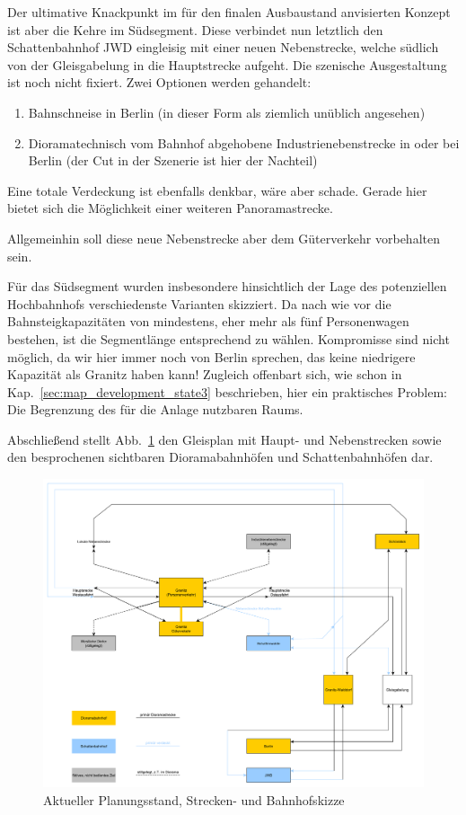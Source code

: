 Der ultimative Knackpunkt im f\"ur den finalen Ausbaustand anvisierten Konzept ist aber die Kehre im S\"udsegment.
Diese verbindet nun letztlich den Schattenbahnhof JWD eingleisig mit einer neuen Nebenstrecke, welche s\"udlich von der Gleisgabelung in die Hauptstrecke aufgeht.
Die szenische Ausgestaltung ist noch nicht fixiert.
Zwei Optionen werden gehandelt:
\begin{enumerate}
	\item Bahnschneise in Berlin (in dieser Form als ziemlich un\"ublich angesehen)
	\item Dioramatechnisch vom Bahnhof abgehobene Industrienebenstrecke in oder bei Berlin (der Cut in der Szenerie ist hier der Nachteil)
\end{enumerate}
Eine totale Verdeckung ist ebenfalls denkbar, w\"are aber schade.
Gerade hier bietet sich die M\"oglichkeit einer weiteren Panoramastrecke.

Allgemeinhin soll diese neue Nebenstrecke aber dem G\"uterverkehr vorbehalten sein.

F\"ur das S\"udsegment wurden insbesondere hinsichtlich der Lage des potenziellen Hochbahnhofs verschiedenste Varianten skizziert.
Da nach wie vor die Bahnsteigkapazit\"aten von mindestens, eher mehr als f\"unf Personenwagen bestehen, ist die Segmentl\"ange entsprechend zu w\"ahlen.
Kompromisse sind nicht m\"oglich, da wir hier immer noch von Berlin sprechen, das keine niedrigere Kapazit\"at als Granitz haben kann!
Zugleich offenbart sich, wie schon in Kap.~\ref{sec:map_development_state3} beschrieben, hier ein praktisches Problem:
Die Begrenzung des f\"ur die Anlage nutzbaren Raums.

Abschlie{\ss}end stellt Abb.~\ref{img:sketch_side_tracks_all} den Gleisplan mit Haupt- und Nebenstrecken sowie den besprochenen sichtbaren Dioramabahnh\"ofen und Schattenbahnh\"ofen dar.

\begin{figure}[h]
\centering
  \includegraphics[width=1.0\textwidth]{img/map_evolution/sketch_side_tracks_all.pdf}
	\caption{Aktueller Planungsstand, Strecken- und Bahnhofskizze}
	\label{img:sketch_side_tracks_all}
\end{figure}




